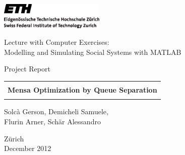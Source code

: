 \thispagestyle{empty}

\begin{center}
\includegraphics[width=5cm]{ETHlogo.eps}

\bigskip


\bigskip


\bigskip


\LARGE{ 	Lecture with Computer Exercises:\\ }
\LARGE{ Modelling and Simulating Social Systems with MATLAB\\}

\bigskip

\bigskip

\small{Project Report}\\

\bigskip

\bigskip

\bigskip

\bigskip


\begin{tabular}{|c|}
\hline
\\
\textbf{\LARGE{Mensa Optimization by Queue Separation}}\\
\\
\hline
\end{tabular}
\bigskip

\bigskip

\bigskip

\LARGE{Solcà Gerson, Demicheli Samuele,}\\
\LARGE{ Flurin Arner, Schär Alessandro}


\bigskip

\bigskip

\bigskip

\bigskip

\bigskip

\bigskip

\bigskip

\bigskip

Zürich\\
December 2012\\

\end{center}